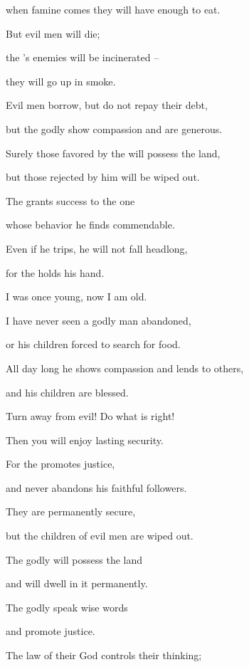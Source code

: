 {\par }{\Q when famine
comes
they will have enough to eat.
\par }{\Q {}But
evil
men will die;
\par }{\Q the
{}’s
enemies
will be incinerated –
\par }{\Q they will go up in smoke.
\par }{\Q {}Evil
men borrow,
but do not
repay
their debt,
\par }{\Q but the godly
show compassion
and are generous.
\par }{\Q {}Surely
those favored by
the
{} will possess
the land,
\par }{\Q but those rejected
by him will be wiped out.
\par }{\Q {}The
{}
grants
success to the one
\par }{\Q whose behavior he finds commendable.
\par }{\Q {}Even if
he trips,
he will not
fall
headlong,
\par }{\Q for
the {}
holds
his hand.
\par }{\Q {}I was once young,
now I am old.
\par }{\Q I have never
seen
a godly
man abandoned,
\par }{\Q or his children
forced to search
for food.
\par }{\Q {}All
day
long he shows compassion
and lends
to others,

\par }{\Q and his children
are blessed.
\par }{\Q {}Turn
away from evil! Do
what is right!

\par }{\Q Then you will enjoy
lasting
security.
\par }{\Q {}For
the {}
promotes
justice,
\par }{\Q and never
abandons
his faithful followers.
\par }{\Q They are permanently
secure,
\par }{\Q but the children
of evil
men are wiped out.
\par }{\Q {}The godly
will possess
the land
\par }{\Q and will dwell
in it permanently.
\par }{\Q {}The godly
speak
wise
words
\par }{\Q and promote
justice.
\par }{\Q {}The law
of their God
controls
their thinking;

}
